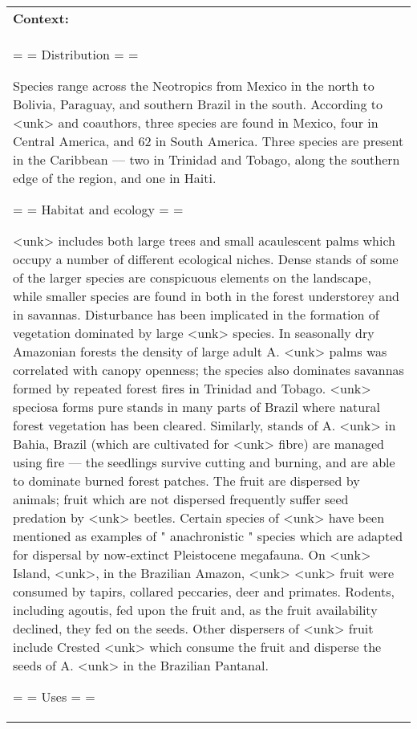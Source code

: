 \documentclass[11pt,a4paper]{article}
\begin{document}
\begin{table}[!h]
\centering
\scriptsize
\begin{tabular}{p{7.8cm}|p{7.8cm}}
	\toprule
	\multicolumn{2}{p{16cm}}{\textbf{Context:}} \\
	\multicolumn{2}{p{16cm}}{= = Distribution = = 

Species range across the Neotropics from Mexico in the north to Bolivia, Paraguay, and southern Brazil in the south. According to <unk> and coauthors, three species are found in Mexico, four in Central America, and 62 in South America. Three species are present in the Caribbean — two in Trinidad and Tobago, along the southern edge of the region, and one in Haiti. 

= = Habitat and ecology = = 

<unk> includes both large trees and small acaulescent palms which occupy a number of different ecological niches. Dense stands of some of the larger species are conspicuous elements on the landscape, while smaller species are found in both in the forest understorey and in savannas. 
Disturbance has been implicated in the formation of vegetation dominated by large <unk> species. In seasonally dry Amazonian forests the density of large adult A. <unk> palms was correlated with canopy openness; the species also dominates savannas formed by repeated forest fires in Trinidad and Tobago. <unk> speciosa forms pure stands in many parts of Brazil where natural forest vegetation has been cleared. Similarly, stands of A. <unk> in Bahia, Brazil (which are cultivated for <unk> fibre) are managed using fire — the seedlings survive cutting and burning, and are able to dominate burned forest patches. 
The fruit are dispersed by animals; fruit which are not dispersed frequently suffer seed predation by <unk> beetles. Certain species of <unk> have been mentioned as examples of " anachronistic " species which are adapted for dispersal by now-extinct Pleistocene megafauna. On <unk> Island, <unk>, in the Brazilian Amazon, <unk> <unk> fruit were consumed by tapirs, collared peccaries, deer and primates. Rodents, including agoutis, fed upon the fruit and, as the fruit availability declined, they fed on the seeds. Other dispersers of <unk> fruit include Crested <unk> which consume the fruit and disperse the seeds of A. <unk> in the Brazilian Pantanal. 

= = Uses = = 

}
\end{tabular}
\end{table}
\end{document}
